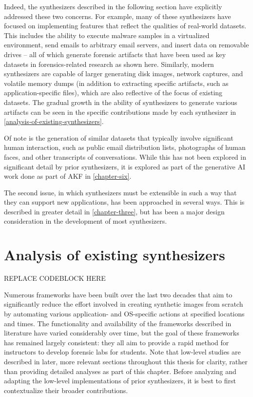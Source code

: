 Indeed, the synthesizers described in the following section have
explicitly addressed these two concerns. For example, many of these
synthesizers have focused on implementing features that reflect the
qualities of real-world datasets. This includes the ability to execute
malware samples in a virtualized environment, send emails to arbitrary
email servers, and insert data on removable drives -- all of which
generate forensic artifacts that have been used as key datasets in
forensics-related research as shown here. Similarly, modern synthesizers
are capable of larger generating disk images, network captures, and
volatile memory dumps (in addition to extracting specific artifacts,
such as application-specific files), which are also reflective of the
focus of existing datasets. The gradual growth in the ability of
synthesizers to generate various artifacts can be seen in the specific
contributions made by each synthesizer in \autoref{analysis-of-existing-synthesizers}.

Of note is the generation of similar datasets that typically involve
significant human interaction, such as public email distribution lists,
photographs of human faces, and other transcripts of conversations.
While this has not been explored in significant detail by prior
synthesizers, it is explored as part of the generative AI work done as
part of AKF in \autoref{chapter-six}.

The second issue, in which synthesizers must be extensible in such a way
that they can support new applications, has been approached in several
ways. This is described in greater detail in \autoref{chapter-three}, but has been a major design consideration in the
development of most synthesizers.

\section{Analysis of existing
synthesizers}\label{analysis-of-existing-synthesizers}

REPLACE CODEBLOCK HERE

Numerous frameworks have been built over the last two decades that aim
to significantly reduce the effort involved in creating synthetic images
from scratch by automating various application- and OS-specific actions
at specified locations and times. The functionality and availability of
the frameworks described in literature have varied considerably over
time, but the goal of these frameworks has remained largely consistent:
they all aim to provide a rapid method for instructors to develop
forensic labs for students. Note that low-level studies are described in
later, more relevant sections throughout this thesis for clarity, rather
than providing detailed analyses as part of this chapter. Before
analyzing and adapting the low-level implementations of prior
synthesizers, it is best to first contextualize their broader
contributions.

